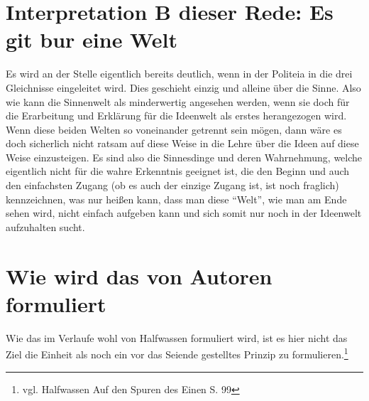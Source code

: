 \section{Interpretation B dieser Rede: Es git bur eine Welt}
Es wird an der Stelle eigentlich bereits deutlich, wenn in der Politeia in die drei Gleichnisse eingeleitet wird. Dies geschieht einzig und alleine über die Sinne. Also wie kann die Sinnenwelt als minderwertig angesehen werden, wenn sie doch für die Erarbeitung und Erklärung für die Ideenwelt als erstes herangezogen wird.
Wenn diese beiden Welten so voneinander getrennt sein mögen, dann wäre es doch sicherlich nicht ratsam auf diese Weise in die Lehre über die Ideen auf diese Weise einzusteigen. Es sind also die Sinnesdinge und deren Wahrnehmung, welche eigentlich nicht für die wahre Erkenntnis geeignet ist, die den Beginn und auch den einfachsten Zugang (ob es auch der einzige Zugang ist, ist noch fraglich) kennzeichnen, was nur heißen kann, dass man diese \enquote{Welt}, wie man am Ende sehen wird, nicht einfach aufgeben kann und sich somit nur noch in der Ideenwelt aufzuhalten sucht.


\section*{Wie wird das von Autoren formuliert}
Wie das im Verlaufe wohl von Halfwassen formuliert wird, ist es hier nicht das Ziel die Einheit als noch ein vor das Seiende gestelltes Prinzip zu formulieren.\footnote{vgl. Halfwassen Auf den Spuren des Einen S. 99}
